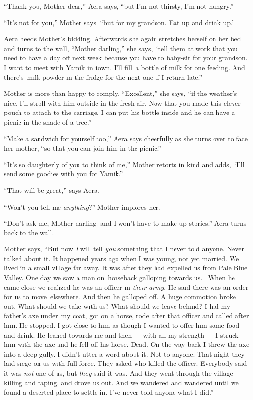 \documentclass[twoside,11pt]{book}
\begin{document}
``Thank you, Mother dear,'' Aera says, ``but I'm not thirsty, I'm not
hungry.''

``It's not for you,'' Mother says, ``but for my grandson. Eat up and drink
up.''

Aera heeds Mother's bidding. Afterwards she again stretches herself on her bed and turns to the wall,
``Mother darling,'' she says, ``tell them at work that you need to have a day
off next week because you have to baby-sit for your grandson. I want to meet with Yamik in town. I'll fill~a bottle of
milk for one feeding. And there's~milk powder in the fridge for the next one if I return late.''

Mother is more than happy to comply. ``Excellent,'' she says, ``if the weather's nice, I'll stroll with him
outside in the fresh air. Now that you made this clever pouch to attach to the carriage, I can put his bottle inside
and he can have a picnic in the shade of a tree.''

``Make a sandwich for yourself too,'' Aera says cheerfully as she turns over to face her
mother, ``so that you can join him in the picnic.''

``It's so daughterly of you to think of me,'' Mother retorts in kind and adds,
``I'll send some goodies with you for Yamik.''

``That will be great,'' says Aera.

``Won't you tell me \textit{anything}?'' Mother implores her.

``Don't ask me, Mother darling, and I won't have to make up stories.'' Aera
turns back to the wall.

Mother says, ``But now \textit{I }will tell \textit{you} something that I never told anyone. Never talked
about it. It happened years ago when I was young, not yet married. We lived in a small village far away. It was after
they had expelled us from Pale Blue Valley. One day we saw a man on~horseback galloping towards us. ~When he came close
we realized he was an officer in \textit{their} \textit{army}. He said there was an order for us to move~elsewhere.
And then he galloped off. A huge commotion broke out. What should we take with us? What should we leave behind? I hid
my father's axe under~my coat, got on a horse, rode after that officer and called after him. He stopped. I got close to
him as though I wanted to offer him some food and drink. He leaned towards me and then --- with all my strength ---  I
struck him with the axe and he fell off his horse. Dead. On the way back I threw the axe into a deep gully. I didn't
utter a word about it. Not to anyone. That night they laid siege on  us with full force. They asked who killed the
officer. Everybody said it was \textit{not} one of us, but \textit{they} said it was. And they went through the village
killing and raping, and drove us out. And we wandered and wandered until we found a deserted place to settle in. I've
never told anyone what I did.''
\end{document}
